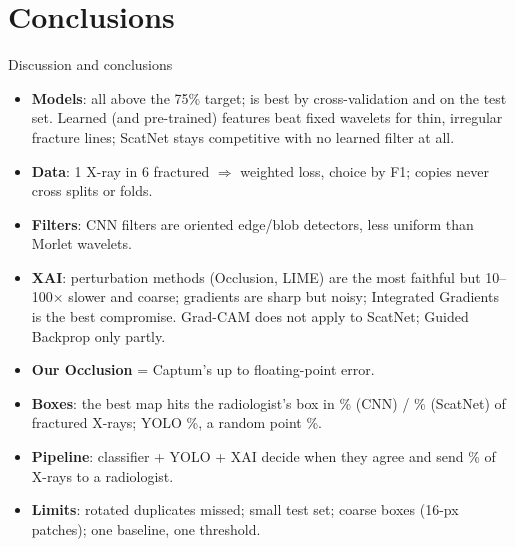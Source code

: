 \documentclass[aspectratio=169,10pt]{beamer}
\begin{document}
\section{Conclusions}
\begin{frame}{Discussion and conclusions}
\small
\begin{itemize}
  \item \textbf{Models}: all above the 75\% target; \BestModel{} is best by cross-validation and on the test set.
        Learned (and pre-trained) features beat fixed wavelets for thin, irregular fracture lines;
        ScatNet stays competitive with no learned filter at all.
  \item \textbf{Data}: 1 X-ray in 6 fractured $\Rightarrow$ weighted loss, choice by F1; copies never cross splits or folds.
  \item \textbf{Filters}: CNN filters are oriented edge/blob detectors, less uniform than Morlet wavelets.
  \item \textbf{XAI}: perturbation methods (Occlusion, LIME) are the most faithful but 10--100$\times$ slower and coarse;
        gradients are sharp but noisy; Integrated Gradients is the best compromise.
        Grad-CAM does not apply to ScatNet; Guided Backprop only partly.
  \item \textbf{Our Occlusion} = Captum's up to floating-point error.
  \item \textbf{Boxes}: the best map hits the radiologist's box in \BestHitCNN\% (CNN) / \BestHitScat\% (ScatNet) of fractured X-rays; YOLO \YoloHit\%, a random point \HitRandom\%.
  \item \textbf{Pipeline}: classifier + YOLO + XAI decide when they agree and send \ReviewPct\% of X-rays to a radiologist.
  \item \textbf{Limits}: rotated duplicates missed; small test set; coarse boxes (16-px patches); one baseline, one threshold.
\end{itemize}
\end{frame}
\end{document}
